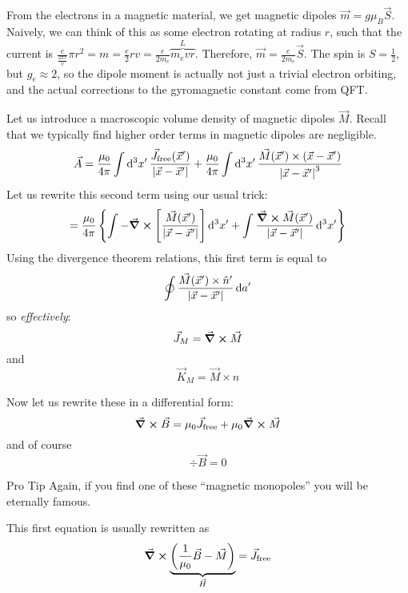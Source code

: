 \documentclass[a4paper,twoside,master.tex]{subfiles}
\begin{document}

From the electrons in a magnetic material, we get magnetic dipoles $ \vec{m} = g \mu_{B} \vec{S} $. Naively, we can think of this as some electron rotating at radius $ r $, such that the current is $ \frac{e}{\frac{2 \pi r}{v}} \pi r^2 = m = \frac{e}{2}rv = \frac{e}{2m_e} \overbrace{m_e vr}^{L} $. Therefore, $ \vec{m} = \frac{e}{2m_e} \vec{S} $. The spin is $ S = \frac{1}{2} $, but $ g_e \approx 2 $, so the dipole moment is actually not just a trivial electron orbiting, and the actual corrections to the gyromagnetic constant come from QFT.

Let us introduce a macroscopic volume density of magnetic dipoles $ \vec{M} $. Recall that we typically find higher order terms in magnetic dipoles are negligible.
\begin{equation}
    \vec{A} = \frac{\mu_0}{4 \pi} \int \dd[3]{x'} \frac{ \vec{J}_{\text{free}}( \vec{x}')}{\abs{ \vec{x} - \vec{x}'}}+ \frac{\mu_0}{4 \pi} \int \dd[3]{x'} \frac{ \vec{M}( \vec{x}') \times ( \vec{x} - \vec{x}')}{\abs{ \vec{x} - \vec{x}'}^3}
\end{equation}
Let us rewrite this second term using our usual trick:
\begin{equation}
    = \frac{\mu_0}{4 \pi}\left\{ \int - \curl{\left[ \frac{ \vec{M}( \vec{x}')}{\abs{ \vec{x} - \vec{x}'}} \right]} \dd[3]{x'} + \int \frac{\curl{ \vec{M}( \vec{x}')}}{\abs{ \vec{x} - \vec{x}'}} \dd[3]{x'} \right\}
\end{equation}
Using the divergence theorem relations, this first term is equal to
\begin{equation}
    \oint \frac{ \vec{M}( \vec{x}') \times \hat{n}'}{\abs{ \vec{x} - \vec{x}'}} \dd{a'}
\end{equation}
so \textit{effectively}:
\begin{equation}
    \vec{J}_{M} = \curl{ \vec{M}}
\end{equation}
and
\begin{equation}
    \vec{K}_{M} = \vec{M} \times \hat{n}
\end{equation}

Now let us rewrite these in a differential form:
\begin{equation}
    \curl{ \vec{B}} = \mu_0 \vec{J}_{\text{free}} + \mu_0 \curl{ \vec{M}}
\end{equation}
and of course
\begin{equation}
    \div{ \vec{B}} = 0
\end{equation}
\begin{note}{Pro Tip}
    Again, if you find one of these ``magnetic monopoles'' you will be eternally famous.
\end{note}
This first equation is usually rewritten as
\begin{equation}
    \curl{\underbrace{\left( \frac{1}{\mu_0} \vec{B} - \vec{M} \right)}_{\vec{H}}} = \vec{J}_{\text{free}}
\end{equation}
\end{document}
